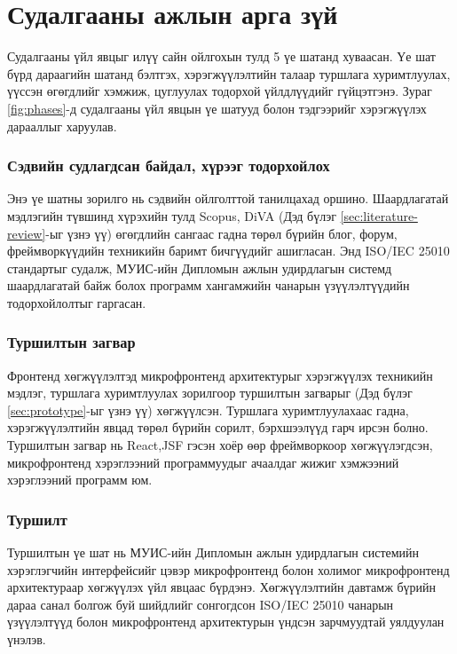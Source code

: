 \section{Судалгааны ажлын арга зүй}
Судалгааны үйл явцыг илүү сайн ойлгохын тулд 5 үе шатанд хуваасан. Үе шат бүрд дараагийн шатанд бэлтгэх, хэрэгжүүлэлтийн талаар туршлага хуримтлуулах, үүссэн өгөгдлийг хэмжиж, цуглуулах тодорхой үйлдлүүдийг гүйцэтгэнэ. Зураг \ref{fig:phases}-д судалгааны үйл явцын үе шатууд болон тэдгээрийг хэрэгжүүлэх дарааллыг харуулав.
\subsubsection{Сэдвийн судлагдсан байдал, хүрээг тодорхойлох}
\hspace*{0.6cm}Энэ үе шатны зорилго нь сэдвийн ойлголттой танилцахад оршино. Шаардлагатай мэдлэгийн түвшинд хүрэхийн тулд Scopus, DiVA (Дэд бүлэг \ref{sec:literature-review}-ыг үзнэ үү) өгөгдлийн сангаас гадна төрөл бүрийн блог, форум, фреймворкүүдийн техникийн баримт бичгүүдийг ашигласан. Энд ISO/IEC 25010 стандартыг судалж, МУИС-ийн Дипломын ажлын удирдлагын системд шаардлагатай байж болох программ хангамжийн чанарын үзүүлэлтүүдийн тодорхойлолтыг гаргасан.
\subsubsection{Туршилтын загвар}
\hspace*{0.6cm}Фронтенд хөгжүүлэлтэд микрофронтенд архитектурыг хэрэгжүүлэх техникийн мэдлэг, туршлага хуримтлуулах зорилгоор туршилтын загварыг (Дэд бүлэг \ref{sec:prototype}-ыг үзнэ үү) хөгжүүлсэн. Туршлага хуримтлуулахаас гадна, хэрэгжүүлэлтийн явцад төрөл бүрийн сорилт, бэрхшээлүүд гарч ирсэн болно. Туршилтын загвар нь React,JSF гэсэн хоёр өөр фреймворкоор хөгжүүлэгдсэн, микрофронтенд хэрэглээний программуудыг ачаалдаг жижиг хэмжээний хэрэглээний программ юм.

\subsubsection{Туршилт}
\hspace*{0.6cm}Туршилтын үе шат нь МУИС-ийн Дипломын ажлын удирдлагын системийн хэрэглэгчийн интерфейсийг цэвэр микрофронтенд болон холимог микрофронтенд архитектураар хөгжүүлэх үйл явцаас бүрдэнэ. Хөгжүүлэлтийн давтамж бүрийн дараа санал болгож буй шийдлийг сонгогдсон ISO/IEC 25010 чанарын үзүүлэлтүүд болон микрофронтенд архитектурын үндсэн зарчмуудтай уялдуулан үнэлэв.

